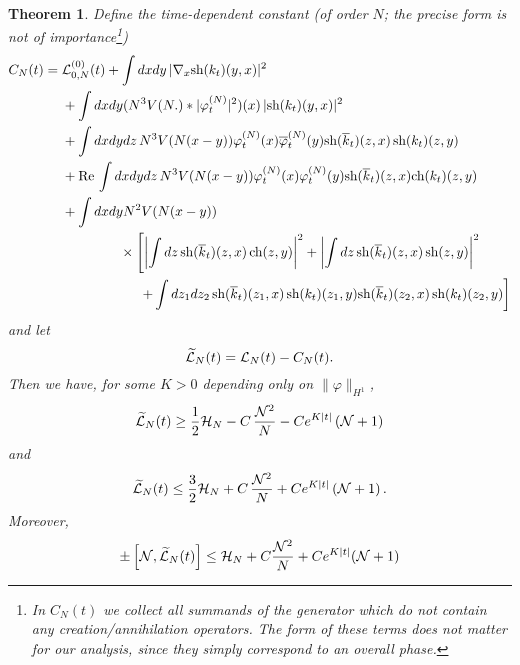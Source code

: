 \documentclass[11pt,a4paper]{article}
\newtheorem{thm}{Theorem}[section]  %
\newcommand{\ech}[2]{#2}	%
\newcommand{\ekt}{e^{K\lvert t\rvert}}	%
\newcommand{\wt}{\widetilde}
\newcommand{\cH}{{\cal H}}
\newcommand{\cL}{{\cal L}}
\newcommand{\cN}{{\cal N}}
\renewcommand{\Re}{\operatorname{Re}\,} 	%
\newcommand{\norm}[1]{\lVert#1\rVert}	%
\begin{document}
\begin{thm}\label{thm:L}
Define the time-dependent constant (of order $N$; the precise form is not of importance\footnote{In $C_N(t)$ we collect all summands of the generator which do not contain any creation/annihilation operators. The form of these terms does not matter for our analysis, since they simply correspond to an overall phase.})
\begin{equation}\label{eq:CNt} \begin{split} 
C_N (t) = \; &\cL^{(0)}_{0,N} (t) + \int dx dy \, |\nabla_x \text{sh} (k_t) (y,x)|^2  \\
 &+  \int dx dy (N^3 V(N.) * |\varphi_t^{(N)}|^2) (x) \, |\text{sh} (k_t) (y,x)|^2 \\
 &+ \int dx dy dz \, N^3 V(N (x-y)) \varphi_t^{(N)} (x) \overline{\varphi}_t^{(N)} (y) \text{sh} (\overline{k}_t) (z,x)  \, \text{sh} (k_t) (z,y)  \\
 &+ \Re \int dx dy dz \, N^3 V(N (x-y)) \varphi_t^{(N)} (x) \varphi_t^{(N)} (y) \text{sh} (\overline{k}_t) (z,x) \text{ch} (k_t) (z,y)  \\
&+ \int dx dy N^2 V(N (x-y)) \\ &\hspace{1.5cm}  \times \left[ \left|\int dz \, \text{sh} (\overline{k}_t) (z,x) \, \text{ch} (z,y) \right|^2  + \left| \int dz \, \text{sh} (\overline{k}_t) (z,x) \, \text{sh} (z,y) \right|^2 \right. \\ &\hspace{2cm}  \left. 
+  \int dz_1 dz_2 \, \text{sh} (\overline{k}_t) (z_1,x) \, \text{sh} (k_t) (z_1,y)  \text{sh} (\overline{k}_t) (z_2,x) \, \text{sh} (k_t) (z_2,y) \right] 
\end{split} \end{equation}
and let
\begin{equation}\label{eq:wtcL} \wt{\cL}_N (t) = \cL_N (t) - C_N (t). \end{equation}
Then we have, for some $K > 0$ depending only on $\norm{\varphi}_{H^1}$,
\begin{equation}\label{eq:thmL-1} \wt{\cL}_N (t) \geq \frac{1}{2} \cH_N - C \, \frac{\cN^2}{N}  - C \ech{\| \varphi_t^{(N)} \|_{H^2}^2}{\ekt}  \left(\cN + 1\right) \end{equation}
and
\begin{equation}\label{eq:thmL-1b} \wt{\cL}_N (t) \leq \frac{3}{2} \cH_N + C \, \frac{\cN^2}{N}  +  C \ech{\| \varphi_t^{(N)} \|_{H^2}^2}{\ekt}  \left(\cN + 1\right). \end{equation}
Moreover, 
\begin{equation}\label{eq:thmL-2} \pm \left[ \cN , \wt{\cL}_N (t) \right]  \leq \cH_N + C \frac{\cN^2}{N} + C \ech{\| \varphi_t^{(N)} \|_{H^2}^2}{\ekt} (\cN+1) \end{equation}

\end{thm}
\end{document}
